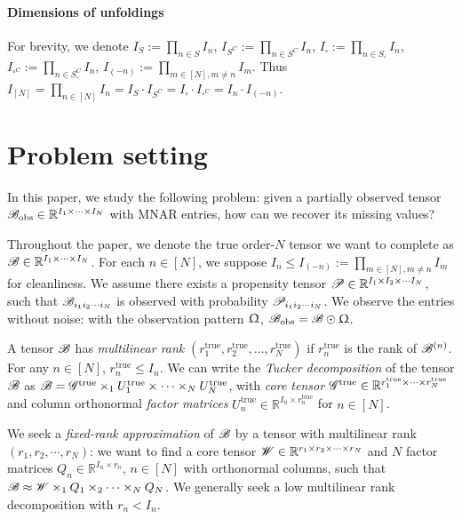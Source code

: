 \documentclass{article}
\newcommand{\T}[2][]{#1\mathscr{\MakeUppercase{#2}}}
\newcommand{\obs}[1]{#1_{\mathrm{obs}}}
\theoremstyle{plain}
\begin{document}
\paragraph{Dimensions of unfoldings}
\label{sec:dims-of-unfoldings}
For brevity, we denote $I_S := \prod_{n \in S} I_n$, $I_{S^C} := \prod_{n \in S^C} I_n$, $I_\square := \prod_{n \in S_\square} I_n$, $I_{\square^C} := \prod_{n \in S_\square^C} I_n$, $ I_{(-n)}:= \prod_{m \in [N], m \neq n} I_m$.
Thus $I_{[N]} = \prod_{n \in [N]} I_n = I_S \cdot I_{S^C} = I_\square \cdot I_{\square^C} = I_n \cdot I_{(-n)}$.

\section{Problem setting}
\label{sec:problem_setting}
In this paper, we study the following problem:
given a partially observed tensor $\obs{\T{B}} \in \mathbb{R}^{I_1 \times \cdots \times I_N}$
with MNAR entries, how can we recover its missing values?

Throughout the paper, we denote the true order-$N$ tensor we want to complete as $\T{B} \in \mathbb{R}^{I_1 \times \cdots \times I_N}$.
For each $n \in [N]$, we suppose $I_n \leq I_{(-n)}:= \prod_{m \in [N], m \neq n} I_m$ for cleanliness. 
We assume there exists a propensity tensor $\T{P}  \in \mathbb{R}^{I_1 \times I_2 \times \cdots I_N}$, such that $\T{B}_{i_1 i_2 \cdots i_N}$ is observed with probability $\T{P}_{i_1 i_2 \cdots i_N}$.
We observe the entries without noise: with the observation pattern $\Upomega$, $\T{B}_\mathrm{obs} = \T{B} \odot \Upomega$.

A tensor $\T{B}$ has \emph{multilinear rank} $(r_1^\mathrm{true}, r_2^\mathrm{true}, \ldots, r_N^\mathrm{true})$ if $r_n^\mathrm{true}$ is the rank of $\T{B}^{(n)}$.
For any $n \in [N]$, $r_n^\mathrm{true} \leq I_n $.
We can write the \emph{Tucker decomposition} of the tensor $\T{B}$ as $\T{B} = \T{G}^\mathrm{true} \times_1 U_1^\mathrm{true} \times \cdots \times_N U_N^\mathrm{true}$, with \emph{core tensor} $\T{G}^\mathrm{true} \in \mathbb{R}^{r_1^\mathrm{true} \times \cdots \times r_N^\mathrm{true}}$ and column orthonormal \emph{factor matrices} $U_n^\mathrm{true} \in \mathbb{R}^{I_n \times r_n^\mathrm{true}}$ for $n \in [N]$.

We seek a \emph{fixed-rank approximation} of $\T{B}$ by a tensor with multilinear rank $(r_1, r_2, \cdots, r_N)$: we want to find a core tensor $\T{W} \in \mathbb{R}^{r_1 \times r_2 \times \cdots \times r_N}$ and $N$ factor matrices $Q_n \in \mathbb{R}^{I_n \times r_n}$, $n \in [N]$ with orthonormal columns, such that $\T{B} \approx \T{W} \times_1 Q_1 \times_2 \cdots \times_N Q_N$. We generally seek a low multilinear rank decomposition with $r_n < I_n $.
\end{document}
